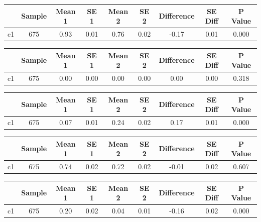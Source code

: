 {
\def\sym#1{\ifmmode^{#1}\else\(^{#1}\)\fi}
\begin{tabular}{l*{1}{cccccccc}}
\hline\hline
            &      Sample&      Mean 1&        SE 1&      Mean 2&        SE 2&  Difference&     SE Diff&     P Value\\
\hline
c1          &         675&        0.93&        0.01&        0.76&        0.02&       -0.17&        0.01&       0.000\\
\hline\hline
\end{tabular}
}
{
\def\sym#1{\ifmmode^{#1}\else\(^{#1}\)\fi}
\begin{tabular}{l*{1}{cccccccc}}
\hline\hline
            &      Sample&      Mean 1&        SE 1&      Mean 2&        SE 2&  Difference&     SE Diff&     P Value\\
\hline
c1          &         675&        0.00&        0.00&        0.00&        0.00&        0.00&        0.00&       0.318\\
\hline\hline
\end{tabular}
}
{
\def\sym#1{\ifmmode^{#1}\else\(^{#1}\)\fi}
\begin{tabular}{l*{1}{cccccccc}}
\hline\hline
            &      Sample&      Mean 1&        SE 1&      Mean 2&        SE 2&  Difference&     SE Diff&     P Value\\
\hline
c1          &         675&        0.07&        0.01&        0.24&        0.02&        0.17&        0.01&       0.000\\
\hline\hline
\end{tabular}
}
{
\def\sym#1{\ifmmode^{#1}\else\(^{#1}\)\fi}
\begin{tabular}{l*{1}{cccccccc}}
\hline\hline
            &      Sample&      Mean 1&        SE 1&      Mean 2&        SE 2&  Difference&     SE Diff&     P Value\\
\hline
c1          &         675&        0.74&        0.02&        0.72&        0.02&       -0.01&        0.02&       0.607\\
\hline\hline
\end{tabular}
}
{
\def\sym#1{\ifmmode^{#1}\else\(^{#1}\)\fi}
\begin{tabular}{l*{1}{cccccccc}}
\hline\hline
            &      Sample&      Mean 1&        SE 1&      Mean 2&        SE 2&  Difference&     SE Diff&     P Value\\
\hline
c1          &         675&        0.20&        0.02&        0.04&        0.01&       -0.16&        0.02&       0.000\\
\hline\hline
\end{tabular}
}

